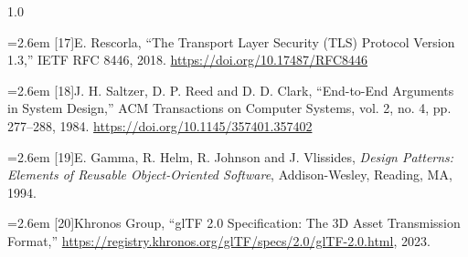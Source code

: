 \documentclass[12pt,a4paper]{report}
\newcommand{\refitem}[2]{\par\noindent\hangindent=2.6em\hangafter=1 [#1]\hspace{0.9em}#2\par\vspace{2pt}}
\begin{document}
\begin{spacing}{1.0}
\refitem{17}{E. Rescorla, ``The Transport Layer Security (TLS) Protocol Version 1.3,'' IETF RFC 8446, 2018. \url{https://doi.org/10.17487/RFC8446}}
\refitem{18}{J. H. Saltzer, D. P. Reed and D. D. Clark, ``End-to-End Arguments in System Design,'' ACM Transactions on Computer Systems, vol. 2, no. 4, pp. 277--288, 1984. \url{https://doi.org/10.1145/357401.357402}}
\refitem{19}{E. Gamma, R. Helm, R. Johnson and J. Vlissides, \textit{Design Patterns: Elements of Reusable Object-Oriented Software}, Addison-Wesley, Reading, MA, 1994.}
\refitem{20}{Khronos Group, ``glTF 2.0 Specification: The 3D Asset Transmission Format,'' \url{https://registry.khronos.org/glTF/specs/2.0/glTF-2.0.html}, 2023.}
\end{spacing}
\end{document}
